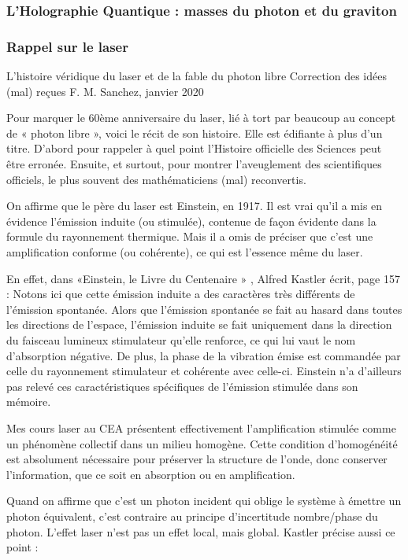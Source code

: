 \documentclass[a4paper,12pt]{article}
\begin{document}
\subsubsection{L'Holographie Quantique : masses du photon et du graviton}

\subsubsection{Rappel sur le laser}

L'histoire véridique du laser et de la fable du photon libre
Correction des idées (mal) reçues
F. M. Sanchez, janvier 2020

Pour marquer le 60ème anniversaire du laser, lié à tort par beaucoup au concept de « photon libre »,  voici le récit de son histoire. Elle est édifiante à plus d'un titre. D'abord pour rappeler à quel point l'Histoire officielle des Sciences peut être erronée. Ensuite, et surtout, pour montrer l'aveuglement des scientifiques officiels, le plus souvent des mathématiciens (mal) reconvertis.

On affirme que le père du laser est Einstein, en 1917. Il est vrai qu'il a mis en évidence l'émission induite (ou stimulée), contenue de façon évidente dans la formule du rayonnement thermique. Mais il a omis de préciser que c'est une amplification conforme (ou cohérente), ce qui est l'essence même du laser.

En effet, dans «Einstein, le Livre du Centenaire » \cite{French}, Alfred Kastler écrit, page 157 : Notons ici que cette émission induite a des caractères très différents de l'émission spontanée. Alors que l'émission spontanée se fait au hasard dans toutes les directions de l'espace, l'émission induite se fait uniquement dans la direction du faisceau lumineux stimulateur qu'elle renforce, ce qui lui vaut le nom d'absorption négative. De plus, la phase de la vibration émise est commandée par celle du rayonnement stimulateur et cohérente avec celle-ci. Einstein n'a d'ailleurs pas relevé ces caractéristiques spécifiques de l'émission stimulée dans son mémoire.

Mes cours laser au CEA présentent effectivement l'amplification stimulée comme un phénomène collectif dans un milieu homogène. Cette condition d'homogénéité est absolument nécessaire pour préserver la structure de l'onde, donc conserver l'information, que ce soit en absorption ou en amplification.

Quand on affirme que c'est un photon incident qui oblige le système à émettre un photon équivalent, c'est contraire au principe d'incertitude nombre/phase du photon. L'effet laser n'est pas un effet local, mais global. Kastler précise aussi ce point :
\end{document}
